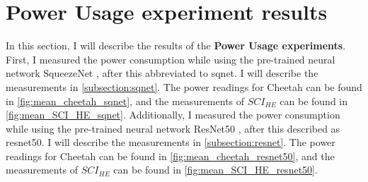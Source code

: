 \documentclass[../thesis.tex]{subfiles}
\begin{document}
\section{Power Usage experiment results}\label{section:power}
In this section, I will describe the results of the \textbf{Power Usage experiments}. First, I measured the power consumption while using the pre-trained neural network SqueezeNet \parencite{sqnet}, after this abbreviated to sqnet. I will describe the measurements in \autoref{subsection:sqnet}. The power readings for Cheetah can be found in \autoref{fig:mean_cheetah_sqnet}, and the measurements of $SCI_{HE}$ can be found in \autoref{fig:mean_SCI_HE_sqnet}. Additionally, I measured the power consumption while using the pre-trained neural network ResNet50 \parencite{resnet}, after this described as resnet50. I will describe the measurements in \autoref{subsection:resnet}. The power readings for Cheetah can be found in \autoref{fig:mean_cheetah_resnet50}, and the measurements of $SCI_{HE}$ can be found in \autoref{fig:mean_SCI_HE_resnet50}. 
\end{document}
